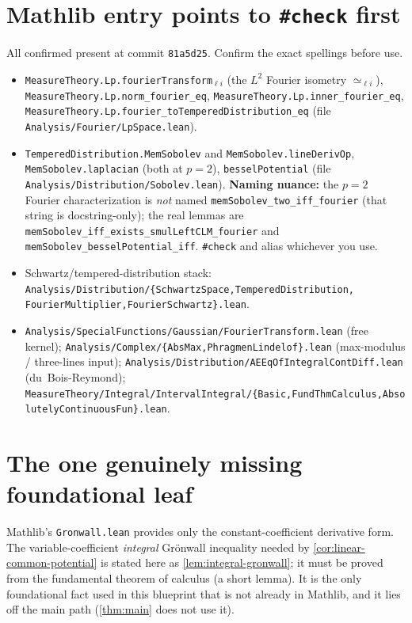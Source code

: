 \documentclass[11pt,oneside]{book}
\theoremstyle{definition}
\theoremstyle{remark}
\newcommand{\1}{\mathbf 1}
\begin{document}
\section{Mathlib entry points to \texttt{\#check} first}\label{sec:mathlib-entrypoints}
All confirmed present at commit \texttt{81a5d25}. Confirm the exact spellings before use.
\begin{itemize}
\item \texttt{MeasureTheory.Lp.fourierTransform}$_{\ell i}$ (the $L^2$ Fourier isometry $\simeq_{\ell i}$),
      \texttt{MeasureTheory.Lp.norm\_fourier\_eq}, \texttt{MeasureTheory.Lp.inner\_fourier\_eq},
      \texttt{MeasureTheory.Lp.fourier\_toTemperedDistribution\_eq}  \quad(file \texttt{Analysis/Fourier/LpSpace.lean}).
\item \texttt{TemperedDistribution.MemSobolev} and \texttt{MemSobolev.lineDerivOp},
      \texttt{MemSobolev.laplacian} (both at $p=2$), \texttt{besselPotential}
      \quad(file \texttt{Analysis/Distribution/Sobolev.lean}).
      \textbf{Naming nuance:} the $p=2$ Fourier characterization is \emph{not} named
      \texttt{memSobolev\_two\_iff\_fourier} (that string is docstring-only); the real lemmas are
      \texttt{memSobolev\_iff\_exists\_smulLeftCLM\_fourier} and \texttt{memSobolev\_besselPotential\_iff}.
      \verb|#check| and alias whichever you use.
\item Schwartz/tempered-distribution stack: \texttt{Analysis/Distribution/\{SchwartzSpace,TemperedDistribution,
      FourierMultiplier,FourierSchwartz\}.lean}.
\item \texttt{Analysis/SpecialFunctions/Gaussian/FourierTransform.lean} (free kernel);
      \texttt{Analysis/Complex/\{AbsMax,PhragmenLindelof\}.lean} (max-modulus / three-lines input);
      \texttt{Analysis/Distribution/AEEqOfIntegralContDiff.lean} (du~Bois-Reymond);
      \texttt{MeasureTheory/Integral/IntervalIntegral/\{Basic,FundThmCalculus,AbsolutelyContinuousFun\}.lean}.
\end{itemize}

\section{The one genuinely missing foundational leaf}
Mathlib's \texttt{Gronwall.lean} provides only the constant-coefficient derivative form. The
variable-coefficient \emph{integral} Gr\"onwall inequality needed by \cref{cor:linear-common-potential} is stated
here as \cref{lem:integral-gronwall}; it must be proved from the fundamental theorem of calculus (a short lemma).
It is the only foundational fact used in this blueprint that is not already in Mathlib, and it lies off the main
path (\cref{thm:main} does not use it).
\end{document}
